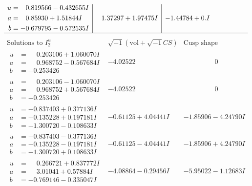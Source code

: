 \documentclass[1p]{elsarticle_modified}
\theoremstyle{definition}
\newcommand{\I}{\sqrt{-1}}
\begin{document}
$$\begin{array}{c|c|c}
\begin{aligned}
u &= \phantom{-}0.819566 - 0.432655 I \\
a &= \phantom{-}0.85930 + 1.51844 I \\
b &= -0.679795 - 0.572535 I\end{aligned}
 & \phantom{-}1.37297 + 1.97475 I & -1.44784 + 0. I\phantom{ +0.000000I}\\
 \hline 
 \end{array}$$\newpage$$\begin{array}{c|c|c}  
\text{Solutions to }I^u_{2}& \I (\text{vol} + \sqrt{-1}CS) & \text{Cusp shape}\\
 \hline 
\begin{aligned}
u &= \phantom{-}0.203106 + 1.060070 I \\
a &= \phantom{-}0.968752 - 0.567684 I \\
b &= -0.253426\phantom{ +0.000000I}\end{aligned}
 & -4.02522\phantom{ +0.000000I} & \phantom{-0.000000 } 0 \\ \hline\begin{aligned}
u &= \phantom{-}0.203106 - 1.060070 I \\
a &= \phantom{-}0.968752 + 0.567684 I \\
b &= -0.253426\phantom{ +0.000000I}\end{aligned}
 & -4.02522\phantom{ +0.000000I} & \phantom{-0.000000 } 0 \\ \hline\begin{aligned}
u &= -0.837403 + 0.377136 I \\
a &= -0.135228 + 0.197181 I \\
b &= -1.300720 - 0.108633 I\end{aligned}
 & -0.61125 + 4.04441 I & -1.85906 - 4.24790 I \\ \hline\begin{aligned}
u &= -0.837403 - 0.377136 I \\
a &= -0.135228 - 0.197181 I \\
b &= -1.300720 + 0.108633 I\end{aligned}
 & -0.61125 - 4.04441 I & -1.85906 + 4.24790 I \\ \hline\begin{aligned}
u &= \phantom{-}0.266721 + 0.837772 I \\
a &= \phantom{-}3.01041 + 0.57884 I \\
b &= -0.769146 - 0.335047 I\end{aligned}
 & -4.08864 - 0.29456 I & -5.95022 - 1.12683 I \\ \hline\begin{aligned}

\end{aligned}
\end{array}$$
\end{document}
